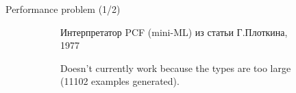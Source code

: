 \documentclass[aspectratio=169
  , xcolor={svgnames}
  , hyperref={ colorlinks,citecolor=Blue
             , linkcolor=DarkRed,urlcolor=DarkBlue}
  , russian
  ]{beamer}
\begin{document}
\begin{frame}[fragile]{Performance problem (1/2)}
\begin{figure}
\begin{subfigure}[t]{0.5\linewidth}\vspace{0em}
\begin{minipage}{0.5\linewidth}
\plotkinBig
\end{minipage}
\end{subfigure}
\hspace{1cm}
\begin{subfigure}[t]{0.35\linewidth}\vspace{0em}
Интерпретатор PCF (mini-ML) из статьи Г.Плоткина, 1977
\vspace{4em}

Doesn't currently work because the types are too large (11102 examples  generated).
\end{subfigure}
\end{figure}
\end{frame}
\end{document}
